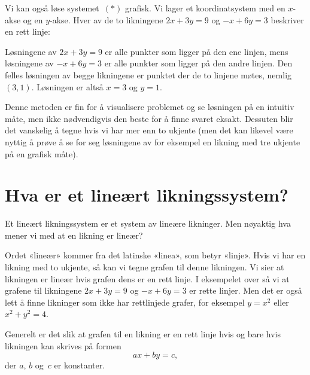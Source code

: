 \begin{ex}
Vi kan også løse systemet~$(\ast)$ grafisk.  Vi lager et
koordinatsystem med en $x$-akse og en $y$-akse.  Hver av de to
likningene $2x+3y=9$ og $-x+6y=3$ beskriver en rett linje:
\begin{center}
\end{center}
Løsningene av $2x + 3y = 9$ er  alle punkter som ligger på den
ene linjen, mens løsningene av $-x + 6y = 3$ er alle punkter som
ligger på den andre linjen.  Den felles løsningen av begge likningene
er punktet der de to linjene møtes, nemlig $(3,1)$.  Løsningen er
altså $x = 3$ og $y = 1$.

Denne metoden er fin for å visualisere problemet og se løsningen på en
intuitiv måte, men ikke nødvendigvis den beste for å finne svaret
eksakt.  Dessuten blir det vanskelig å tegne hvis vi har mer enn to
ukjente (men det kan likevel være nyttig å prøve å se for seg
løsningene av for eksempel en likning med tre ukjente på en grafisk
måte).
\end{ex}


\section*{Hva er et lineært likningssystem?}

Et lineært likningssystem er et system av lineære likninger.  Men
nøyaktig hva mener vi med at en likning er lineær?

Ordet «lineær» kommer fra det latinske «linea», som betyr «linje».
Hvis vi har en likning med to ukjente, så kan vi tegne grafen til
denne likningen.  Vi sier at likningen er lineær hvis grafen dens er
en rett linje.  I eksempelet over så vi at grafene til likningene
$2x + 3y = 9$ og $-x + 6y = 3$ er rette linjer.  Men det er også lett
å finne likninger som ikke har rettlinjede grafer, for eksempel
$y = x^2$ eller $x^2 + y^2 = 4$.

Generelt er det slik at grafen til en likning er en rett linje hvis og
bare hvis likningen kan skrives på formen
\[
ax + by = c,
\]
der $a$, $b$ og~$c$ er konstanter.

